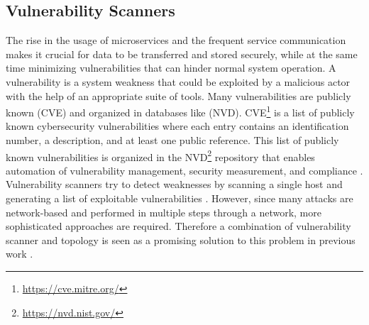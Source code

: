 \subsection{Vulnerability Scanners}
\label{chap:vulnerability_scanners}

The rise in the usage of microservices and the frequent service communication makes it crucial for data to be transferred and stored securely, while at the same time minimizing vulnerabilities that can hinder normal system operation. A vulnerability is a system weakness that could be exploited by a malicious actor with the help of an appropriate suite of tools. Many vulnerabilities are publicly known (CVE) and organized in databases like (NVD). CVE\footnote{\url{https://cve.mitre.org/}} is a list of publicly known cybersecurity vulnerabilities where each entry contains an identification number, a description, and at least one public reference. This list of publicly known vulnerabilities is organized in the  NVD\footnote{\url{https://nvd.nist.gov/}} repository that enables automation of vulnerability management, security measurement, and compliance \cite{booth2013national}. Vulnerability scanners try to detect weaknesses by scanning a single host and generating a list of exploitable vulnerabilities \cite{deraison1999nessus, farmer1990cops}. However, since many attacks are network-based and performed in multiple steps through a network, more sophisticated approaches are required. Therefore a combination of vulnerability scanner and topology is seen as a promising solution to this problem in previous work \cite{sheyner2002automated, ingols2006practical}.
